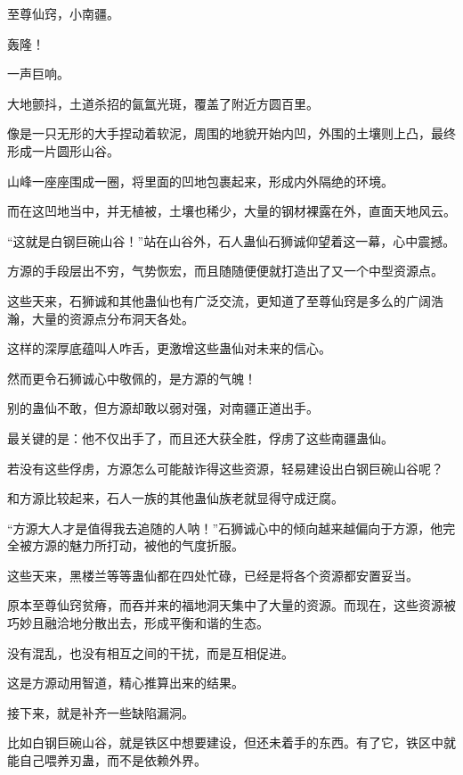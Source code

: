 
\begin{this_body}

至尊仙窍，小南疆。

轰隆！

一声巨响。

大地颤抖，土道杀招的氤氲光斑，覆盖了附近方圆百里。

像是一只无形的大手捏动着软泥，周围的地貌开始内凹，外围的土壤则上凸，最终形成一片圆形山谷。

山峰一座座围成一圈，将里面的凹地包裹起来，形成内外隔绝的环境。

而在这凹地当中，并无植被，土壤也稀少，大量的钢材裸露在外，直面天地风云。

“这就是白钢巨碗山谷！”站在山谷外，石人蛊仙石狮诚仰望着这一幕，心中震撼。

方源的手段层出不穷，气势恢宏，而且随随便便就打造出了又一个中型资源点。

这些天来，石狮诚和其他蛊仙也有广泛交流，更知道了至尊仙窍是多么的广阔浩瀚，大量的资源点分布洞天各处。

这样的深厚底蕴叫人咋舌，更激增这些蛊仙对未来的信心。

然而更令石狮诚心中敬佩的，是方源的气魄！

别的蛊仙不敢，但方源却敢以弱对强，对南疆正道出手。

最关键的是：他不仅出手了，而且还大获全胜，俘虏了这些南疆蛊仙。

若没有这些俘虏，方源怎么可能敲诈得这些资源，轻易建设出白钢巨碗山谷呢？

和方源比较起来，石人一族的其他蛊仙族老就显得守成迂腐。

“方源大人才是值得我去追随的人呐！”石狮诚心中的倾向越来越偏向于方源，他完全被方源的魅力所打动，被他的气度折服。

这些天来，黑楼兰等等蛊仙都在四处忙碌，已经是将各个资源都安置妥当。

原本至尊仙窍贫瘠，而吞并来的福地洞天集中了大量的资源。而现在，这些资源被巧妙且融洽地分散出去，形成平衡和谐的生态。

没有混乱，也没有相互之间的干扰，而是互相促进。

这是方源动用智道，精心推算出来的结果。

接下来，就是补齐一些缺陷漏洞。

比如白钢巨碗山谷，就是铁区中想要建设，但还未着手的东西。有了它，铁区中就能自己喂养刃蛊，而不是依赖外界。


\end{this_body}
